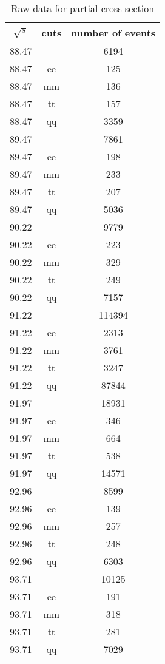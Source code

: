 \begin{table}[htpb]
	\centering
\begin{tabular}{ccc}
	\toprule
	$\sqrt{s}$ &  cuts &  number of events\\
	\midrule
\num{88.47} &   & \num{ 6194}\\
\num{88.47} &  ee & \num{ 125}\\
\num{88.47} &  mm & \num{ 136}\\
\num{88.47} &  tt & \num{ 157}\\
\num{88.47} &  qq & \num{ 3359}\\
\num{89.47} &   & \num{ 7861}\\
\num{89.47} &  ee & \num{ 198}\\
\num{89.47} &  mm & \num{ 233}\\
\num{89.47} &  tt & \num{ 207}\\
\num{89.47} &  qq & \num{ 5036}\\
\num{90.22} &   & \num{ 9779}\\
\num{90.22} &  ee & \num{ 223 }\\
\num{90.22} &  mm & \num{ 329}\\
\num{90.22} &  tt & \num{ 249}\\
\num{90.22} &  qq & \num{ 7157}\\
\num{91.22} &   & \num{ 114394}\\
\num{91.22} &  ee & \num{ 2313}\\
\num{91.22} &  mm & \num{ 3761}\\
\num{91.22} &  tt & \num{ 3247}\\
\num{91.22} &  qq & \num{ 87844}\\
\num{91.97} &   & \num{ 18931}\\
\num{91.97} &  ee & \num{ 346}\\
\num{91.97} &  mm & \num{ 664}\\
\num{91.97} &  tt & \num{ 538}\\
\num{91.97} &  qq & \num{ 14571}\\
\num{92.96} &   & \num{ 8599}\\
\num{92.96} &  ee & \num{ 139}\\
\num{92.96} &  mm & \num{ 257}\\
\num{92.96} &  tt & \num{ 248}\\
\num{92.96} &  qq & \num{ 6303}\\
\num{93.71} &   & \num{ 10125}\\
\num{93.71} &  ee & \num{ 191}\\
\num{93.71} &  mm & \num{ 318}\\
\num{93.71} &  tt & \num{ 281}\\
\num{93.71} &  qq & \num{ 7029}\\
\bottomrule
\end{tabular}
	\caption{Raw data for partial cross section}
	\label{tab:}
\end{table}
